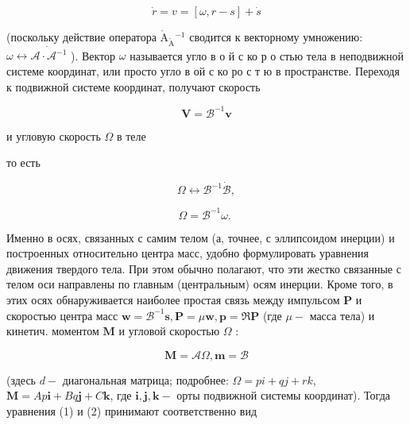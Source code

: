 \documentclass[10pt]{article}
\def\AA{\mathring{\mathrm{A}}}
\begin{document}
\[

\dot{r}=v=[\omega, r-s]+\dot{s}

\]



(поскольку действие оператора $\AA_{\AA}{ }^{-1}$ сводится к векторному умножению: $\omega \leftrightarrow \dot{\mathcal{A} \cdot \mathcal{A}^{-1}}$ ). Вектор $\omega$ называется угло в о й с ко р о стью тела в неподвижной системе координат, или просто угло в ой с ко ро с т ю в пространстве. Переходя к подвижной системе координат, получают скорость



\[

\boldsymbol{V}=\mathscr{B}^{-1} \boldsymbol{v}

\]



и угловую скорость $\Omega$ в теле



то есть



\[

\Omega \leftrightarrow \mathscr{\mathcal { B }}^{-1} \dot{\mathscr{B}},

\]



\[

\Omega=\mathscr{B}^{-1} \omega \text {. }

\]



Именно в осях, связанных с самим телом (а, точнее, с эллипсоидом инерции) и построенных относительно центра масс, удобно формулировать уравнения движения твердого тела. При этом обычно полагают, что эти жестко связанные с телом оси направлены по главным (центральным) осям инерции. Кроме того, в этих осях обнаруживается наиболее простая связь между импульсом $\boldsymbol{P}$ и скоростью центра масс $\boldsymbol{w}=\mathscr{B}^{-1} \boldsymbol{s}, \boldsymbol{P}=\mu \boldsymbol{w}, \boldsymbol{p}=\mathscr{\Re} \boldsymbol{P}$ (где $\mu-$ масса тела) и кинетич. моментом $\boldsymbol{M}$ и угловой скоростью $\Omega$ :



\[

\boldsymbol{M}=\mathscr{A} \Omega, \boldsymbol{m}=\mathscr{B}

\]



(здесь $d-$ диагональная матрица; подробнее: $\Omega=p i+q j+r k$, $\boldsymbol{M}=A p \boldsymbol{i}+B q \boldsymbol{j}+C \boldsymbol{k}$, где $\boldsymbol{i}, \boldsymbol{j}, \boldsymbol{k}-$ орты подвижной системы координат). Тогда уравнения (1) и (2) принимают соответственно вид
\end{document}
